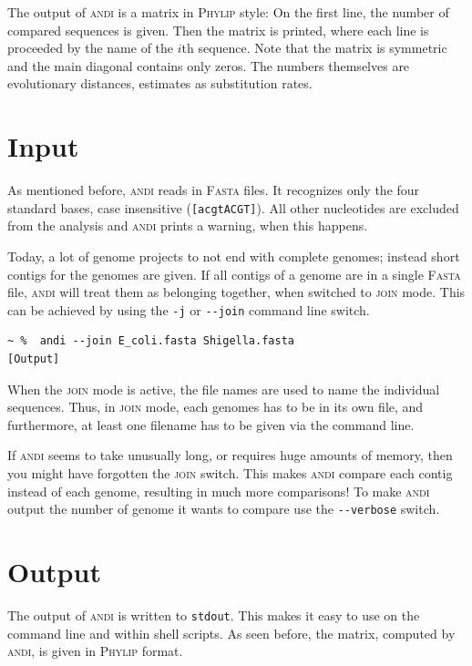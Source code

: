\documentclass[a4paper,
  10pt,
  english,
  DIV=12,
  BCOR=8mm]{scrbook}
\newcommand{\algo}[1]{\textsc{{#1}}}
\newcommand{\andi}{\algo{andi} }
\begin{document}
The output of \andi is a matrix in \algo{Phylip} style: On the first line, the number of compared sequences is given. Then the matrix is printed, where each line is proceeded by the name of the $i$th sequence. Note that the matrix is symmetric and the main diagonal contains only zeros. The numbers themselves are evolutionary distances, estimates as substitution rates.


\section{Input} \label{sec:join}

As mentioned before, \andi reads in \algo{Fasta} files. It recognizes only the four standard bases, case insensitive (\lstinline![acgtACGT]!). All other nucleotides are excluded from the analysis and \andi prints a warning, when this happens.

Today, a lot of genome projects to not end with complete genomes; instead short contigs for the genomes are given. If all contigs of a genome are in a single \algo{Fasta} file, \andi will treat them as belonging together, when switched to \algo{join} mode. This can be achieved by using the \lstinline!-j! or \lstinline!--join! command line switch.

\begin{lstlisting}
~ %  andi --join E_coli.fasta Shigella.fasta
[Output]
\end{lstlisting}

When the \algo{join} mode is active, the file names are used to name the individual sequences. Thus, in \algo{join} mode, each genomes has to be in its own file, and furthermore, at least one filename has to be given via the command line.

If \andi seems to take unusually long, or requires huge amounts of memory, then you might have forgotten the \algo{join} switch. This makes \andi compare each contig instead of each genome, resulting in much more comparisons! To make \andi output the number of genome it wants to compare use the \lstinline$--verbose$ switch.

\section{Output}

The output of \andi is written to \lstinline$stdout$. This makes it easy to use on the command line and within shell scripts. As seen before, the matrix, computed by \algo{andi}, is given in \algo{Phylip} format.
\end{document}
